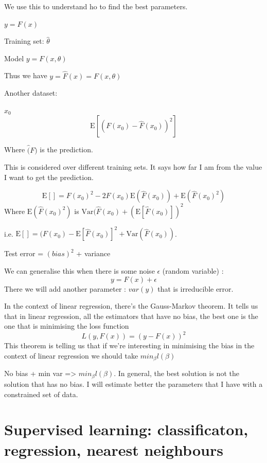 \documentclass[a4paper]{tufte-book}
\newcommand{\E}{\mathrm{E}}
\newcommand{\var}{\mathrm{Var}}
\begin{document}
We use this to understand ho to find the best parameters.

$y=F(x)$

Training set: $\hat{\theta}$

Model $y=F(x,\theta)$

Thus we have $y= \hat{F}(x) = F(x,\theta)$

Another dataset:

$x_0$
\begin{equation}
\E [(F(x_0) - \hat{F}(x_0) )^2]
\end{equation}

Where $\hat(F)$ is the prediction.

This is considered over different training sets. It says how far I am from the value I want to get the prediction.

\begin{equation}
\E[] = F(x_0)^2 - 2F(x_0) \E (\hat{F}(x_0)) + \E (\hat{F}(x_0)^2)
\end{equation}
Where $\E (\hat{F}(x_0)^2)$ is $\var(\hat{F}(x_0) + (\E[\hat{F}(x_0)])^2$

i.e. $\E[] = (F(x_0) - \E[\hat{F}(x_0)]^2 + \var(\hat{F}(x_0))$.

Test error = $(bias)^2$ + variance

We can generalise this when there is some noise $\epsilon$ (random variable) :
\begin{equation}
y = F(x) + \epsilon
\end{equation} 
There we will add another parameter : $var(y)$ that is irreducible error.

In the context of linear regression, there’s the Gauss-Markov theorem.
It tells us that in linear regression, all the estimators that have no bias, the best one is the one that is minimising the loss function
\begin{equation}
L(y,F(x)) = (y-F(x))^2
\end{equation}
This theorem is telling us that if we’re interesting in minimising the bias in the context of linear regression we should take $min_\beta l(\beta)$

No bias + min var => $min_\beta l(\beta)$.
In general, the best solution is not the solution that has no bias.
I will estimate better the parameters that I have with a constrained set of data.


\chapter{Supervised learning: classificaton, regression, nearest neighbours}
\label{ch:supervised-learning}
\end{document}
